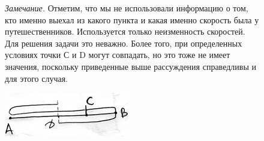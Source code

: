 \begin{figure}[h!]
\begin{minipage}{0.69\linewidth}\setlength{\parindent}{1.5em}
\textit{Замечание.} Отметим, что мы не использовали информацию о том, кто именно выехал из какого пункта и какая именно скорость была у путешественников. Используется только неизменность скоростей. Для решения задачи это неважно. Более того, при определенных условиях точки С и D могут совпадать, но это тоже не имеет значения, поскольку приведенные выше рассуждения справедливы и для этого случая.
\end{minipage}
\begin{minipage}{0.3\linewidth}
    \includegraphics[scale=0.7]{./img/ABC}
\end{minipage}
\end{figure}